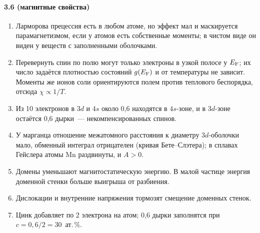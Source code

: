 {\paragraph{3.6 (магнитные свойства)}
\begin{enumerate}[label=\arabic*.]
\item Ларморова прецессия есть в любом атоме, но эффект мал и маскируется
парамагнетизмом, если у атомов есть собственные моменты; в чистом виде
он виден у веществ с заполненными оболочками.
\item Перевернуть спин по полю могут только электроны в узкой полосе у
$E_{\mathrm{F}}$; их число задаётся плотностью состояний $g(E_{\mathrm{F}})$ и от температуры
не зависит. Моменты же ионов соли ориентируются полем против теплового
беспорядка, отсюда $\chi\propto1/T$.
\item Из 10 электронов в $3d$ и $4s$ около 0,6 находятся в $4s$-зоне, и в
$3d$-зоне остаётся 0,6 дырки~— некомпенсированных спинов.
\item У марганца отношение межатомного расстояния к диаметру
$3d$-оболочки мало, обменный интеграл отрицателен (кривая Бете--Слэтера);
в сплавах Гейслера атомы Mn раздвинуты, и $A>0$.
\item Домены уменьшают магнитостатическую энергию. В малой частице
энергия доменной стенки больше выигрыша от разбиения.
\item Дислокации и внутренние напряжения тормозят смещение доменных
стенок.
\item Цинк добавляет по 2 электрона на атом; 0,6 дырки заполнятся при
$c=0{,}6/2=30$~ат.\,\%.
\end{enumerate}

}
